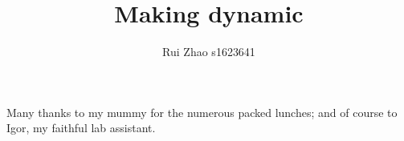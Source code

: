 \documentclass[msc,cs,logo,abbrevs,11pt]{infthesis}
\title{Making \dpy dynamic}
\author{Rui Zhao s1623641}
\begin{document}
\begin{preliminary}
\maketitle

\begin{acknowledgements}
Many thanks to my mummy for the numerous packed lunches; and of course to
Igor, my faithful lab assistant.
\end{acknowledgements}

\standarddeclaration


\tableofcontents


\end{preliminary}


	





	

	

	




%

%





\end{document}

